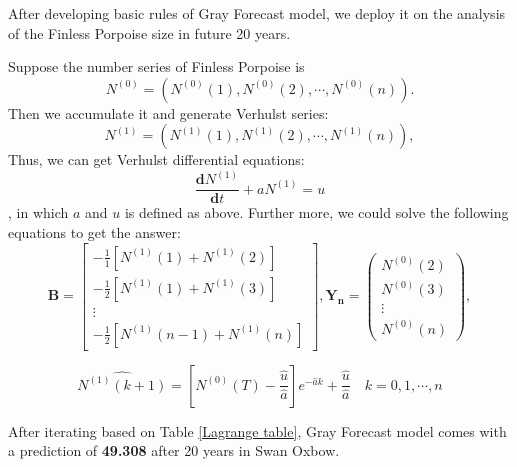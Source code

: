 \documentclass{mcmthesis}
\numberwithin{figure}{section}
\numberwithin{table}{section}
\numberwithin{equation}{section}
\begin{document}
\par
After developing basic rules of Gray Forecast model, we deploy it on
the analysis of the Finless Porpoise size in future 20 years. 
\par
Suppose the number series of Finless Porpoise is
$$
N^{(0)} = (N^{(0)}(1),N^{(0)}(2),\cdots, N^{(0)}(n)).
$$ 
Then we accumulate it and generate Verhulst series:
$$
N^{(1)} = (N^{(1)}(1),N^{(1)}(2),\cdots, N^{(1)}(n)),
$$ 
Thus, we can get Verhulst differential equations:
$$
\frac{\mathbf{d}N^{(1)}}{\mathbf{d}t} + aN^{(1)} = u
$$ 
, in which $ a $ and $ u $ is defined as above. Further more, 
we could solve the following equations to get the answer:
$$
\bm{B} = 
\begin{bmatrix}
  -\frac{1}{1}[N^{(1)}(1)+N^{(1)}(2)]\\
  -\frac{1}{2}[N^{(1)}(1)+N^{(1)}(3)]\\
  \vdots \\
  -\frac{1}{2}[N^{(1)}(n-1)+N^{(1)}(n)]
\end{bmatrix},
\bm{Y_n} = \left(
\begin{array}{c}
  N^{(0)}(2)\\
  N^{(0)}(3)\\
  \vdots\\
  N^{(0)}(n)
\end{array}\right),
$$  

$$
  \hat{N^{(1)}(k+1)} = [N^{(0)}(T)-\frac{\hat{u}}{\hat{a}}]e^{-\hat{a}k}+\frac{\hat{u}}{\hat{a}}
  \quad k = 0,1,\cdots, n
$$ 

After iterating based on Table \ref{Lagrange table}, Gray Forecast model
comes with a prediction of \textbf{49.308} after 20 years in Swan Oxbow.
\end{document}
